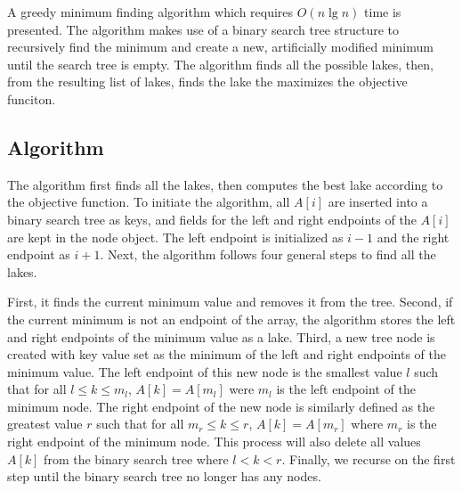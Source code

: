 \documentclass{6046}
\begin{document}
A greedy minimum finding algorithm which requires $O(n \lg n)$ time is presented. The algorithm makes use of a binary search tree structure to recursively find the minimum and create a new, artificially modified minimum until the search tree is empty. The algorithm finds all the possible lakes, then, from the resulting list of lakes, finds the lake the maximizes the objective funciton.

\subsection*{Algorithm}

The algorithm first finds all the lakes, then computes the best lake according to the objective function. To initiate the algorithm, all $A[i]$ are inserted into a binary search tree as keys, and fields for the left and right endpoints of the $A[i]$ are kept in the node object. The left endpoint is initialized as $i - 1$ and the right endpoint as $i + 1$. Next, the algorithm follows four general steps to find all the lakes. 

First, it finds the current minimum value and removes it from the tree. Second, if the current minimum is not an endpoint of the array, the algorithm stores the left and right endpoints of the minimum value as a lake. Third, a new tree node is created with key value set as the minimum of the left and right endpoints of the minimum value. The left endpoint of this new node is the smallest value $l$ such that for all $l \leq k \leq m_l$, $A[k] = A[m_l]$ were $m_l$ is the left endpoint of the minimum node. The right endpoint of the new node is similarly defined as the greatest value $r$ such that for all $m_r \leq k \leq r$, $A[k] = A[m_r]$ where $m_r$ is the right endpoint of the minimum node. This process will also delete all values $A[k]$ from the binary search tree where $l < k < r$. Finally, we recurse on the first step until the binary search tree no longer has any nodes.  
\end{document}

